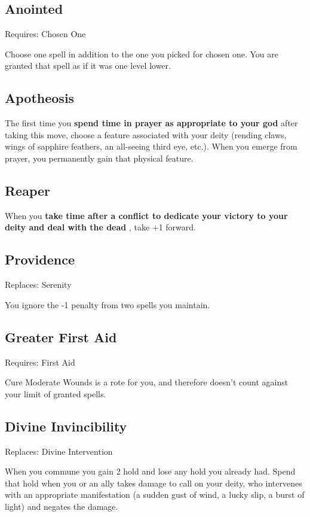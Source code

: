 \subsection{Anointed}


 Requires: Chosen One


 Choose one spell in addition to the one you picked for chosen one. You are granted that spell as if it was one level lower.
\subsection{Apotheosis}


 The first time you \textbf{spend time in prayer as appropriate to your god}
 after taking this move, choose a feature associated with your deity (rending claws, wings of sapphire feathers, an all-seeing third eye, etc.). When you emerge from prayer, you permanently gain that physical feature.
\subsection{Reaper}


 When you \textbf{take time after a conflict to dedicate your victory to your deity and deal with the dead}
, take +1 forward.
\subsection{Providence}


 Replaces: Serenity


 You ignore the -1 penalty from two spells you maintain.
\subsection{Greater First Aid}


 Requires: First Aid


 Cure Moderate Wounds is a rote for you, and therefore doesn't count against your limit of granted spells.
\subsection{Divine Invincibility}


 Replaces: Divine Intervention


 When you commune you gain 2 hold and lose any hold you already had. Spend that hold when you or an ally takes damage to call on your deity, who intervenes with an appropriate manifestation (a sudden gust of wind, a lucky slip, a burst of light) and negates the damage.
